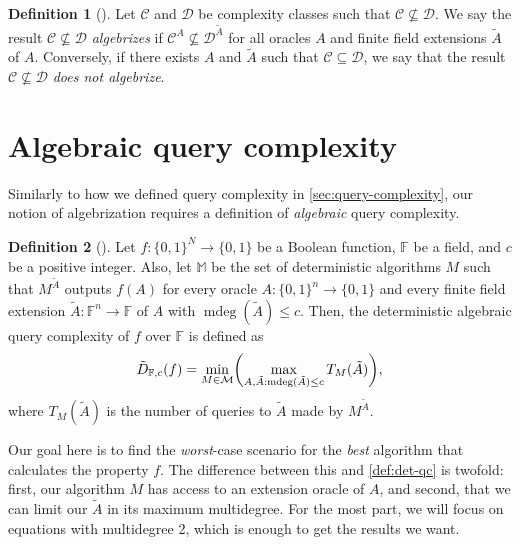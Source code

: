 \documentclass[english,12pt]{reedthesis}
\theoremstyle{plain}
\theoremstyle{definition}
\newtheorem{defn}[defn]{Definition}
\theoremstyle{remark}
\DeclareMathOperator{\mdeg}{mdeg}
\begin{document}
\begin{defn}[{\cite[Def.\ 2.3]{AW09}}]\label{def:algebrization-neq}
  Let $\mathcal{C}$ and $\mathcal{D}$ be complexity classes such that $\mathcal{C} \nsubseteq \mathcal{D}$. We say the result
  $\mathcal{C} \nsubseteq \mathcal{D}$ \emph{algebrizes} if $\mathcal{C}^{A} \nsubseteq \mathcal{D}^{\tilde{A}}$ for all oracles $A$ and
  finite field extensions $\tilde{A}$ of $A$. Conversely, if there exists $A$
  and $\tilde{A}$ such that $\mathcal{C} \subseteq \mathcal{D}$, we say that the result $\mathcal{C} \nsubseteq \mathcal{D}$ \emph{does
    not algebrize}.
\end{defn}

\section{Algebraic query complexity}\label{sec:alg-query-complexity}

Similarly to how we defined query complexity in \cref{sec:query-complexity}, our
notion of algebrization requires a definition of \emph{algebraic} query
complexity. %

\begin{defn}[{\cite[Def. 4.1]{AW09}}]\label{def:aqc}
  Let $f\colon \{0, 1\}^{N} \rightarrow \{0, 1\}$ be a Boolean function, $\mathbb{F}$ be a
  field, and $c$ be a positive integer. Also, let $\mathbb{M}$ be the set of
  deterministic algorithms $M$ such that $M^{\tilde{A}}$ outputs $f(A)$ for
  every oracle $A\colon \{0, 1\}^{n} \rightarrow \{0, 1\}$ and every finite field
  extension $\tilde{A}\colon \mathbb{F}^{n} \rightarrow \mathbb{F}$ of $A$ with
  $\mdeg(\tilde{A}) \le c$. Then, the deterministic algebraic query complexity of
  $f$ over $\mathbb{F}$ is defined as
  \begin{equation}
    \tilde{D}_{\mathbb{F}, c}(f) = \min_{M \in \mathcal{M}}\mleft(
      \max_{A, \tilde{A}: \mdeg(\tilde{A}) \le c}T_{M}(\tilde{A})
    \mright),
  \end{equation}
  where $T_{M}(\tilde{A})$ is the number of queries to $\tilde{A}$ made by
  $M^{\tilde{A}}$.
\end{defn}

Our goal here is to find the \emph{worst}-case scenario for the \emph{best}
algorithm that calculates the property $f$. The difference between this and
\cref{def:det-qc} is twofold: first, our algorithm $M$ has access to
an extension oracle of $A$, and second, that we can limit our $\tilde{A}$ in
its maximum multidegree. For the most part, we will focus on equations with
multidegree 2, which is enough to get the results we want.
\end{document}
